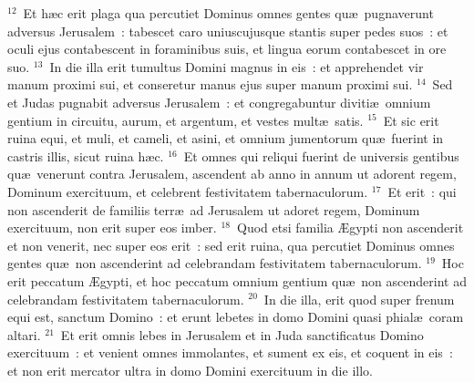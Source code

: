 ${}^{12}$~Et h\ae c erit plaga qua percutiet Dominus omnes gentes qu\ae\ pugnaverunt adversus Jerusalem~: tabescet caro uniuscujusque stantis super pedes suos~: et oculi ejus contabescent in foraminibus suis, et lingua eorum contabescet in ore suo.
${}^{13}$~In die illa erit tumultus Domini magnus in eis~: et apprehendet vir manum proximi sui, et conseretur manus ejus super manum proximi sui.
${}^{14}$~Sed et Judas pugnabit adversus Jerusalem~: et congregabuntur diviti\ae\ omnium gentium in circuitu, aurum, et argentum, et vestes mult\ae\ satis.
${}^{15}$~Et sic erit ruina equi, et muli, et cameli, et asini, et omnium jumentorum qu\ae\ fuerint in castris illis, sicut ruina h\ae c.
${}^{16}$~Et omnes qui reliqui fuerint de universis gentibus qu\ae\ venerunt contra Jerusalem, ascendent ab anno in annum ut adorent regem, Dominum exercituum, et celebrent festivitatem tabernaculorum.
${}^{17}$~Et erit~: qui non ascenderit de familiis terr\ae\ ad Jerusalem ut adoret regem, Dominum exercituum, non erit super eos imber.
${}^{18}$~Quod etsi familia \AE gypti non ascenderit et non venerit, nec super eos erit~: sed erit ruina, qua percutiet Dominus omnes gentes qu\ae\ non ascenderint ad celebrandam festivitatem tabernaculorum.
${}^{19}$~Hoc erit peccatum \AE gypti, et hoc peccatum omnium gentium qu\ae\ non ascenderint ad celebrandam festivitatem tabernaculorum.
${}^{20}$~In die illa, erit quod super frenum equi est, sanctum Domino~: et erunt lebetes in domo Domini quasi phial\ae\ coram altari.
${}^{21}$~Et erit omnis lebes in Jerusalem et in Juda sanctificatus Domino exercituum~: et venient omnes immolantes, et sument ex eis, et coquent in eis~: et non erit mercator ultra in domo Domini exercituum in die illo.
